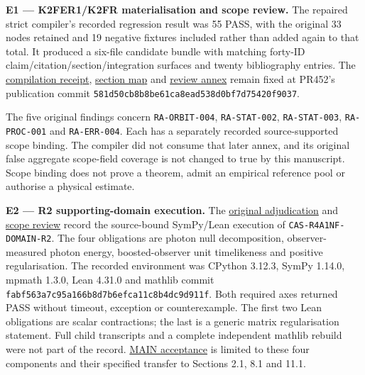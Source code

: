 \documentclass[
  11pt,
  a4paper]{article}
\begin{document}
\textbf{E1 --- K2FER1/K2FR materialisation and scope review.} The repaired strict compiler's recorded regression result was 55 PASS, with the original 33 nodes retained and 19 negative fixtures included rather than added again to that total. It produced a six-file candidate bundle with matching forty-ID claim/citation/section/integration surfaces and twenty bibliography entries. The \href{https://github.com/cosmosapjw-quantum/htt_base/blob/581d50cb8b8be61ca8ead538d0bf7d75420f9037/artifacts/research_reports/k2fr_20260905/authority-bundle/K2F_COMPILATION_RECEIPT.json}{compilation receipt}, \href{https://github.com/cosmosapjw-quantum/htt_base/blob/581d50cb8b8be61ca8ead538d0bf7d75420f9037/artifacts/research_reports/k2fr_20260905/authority-bundle/REPORT_SECTION_CLAIM_MAP_V3.csv}{section map} and \href{https://github.com/cosmosapjw-quantum/htt_base/blob/581d50cb8b8be61ca8ead538d0bf7d75420f9037/artifacts/research_reports/k2fr_20260905/K2FR_REVIEW_ANNEX.json}{review annex} remain fixed at PR452's publication commit {\ttfamily\nolinkurl{581d50cb8b8be61ca8ead538d0bf7d75420f9037}}.

The five original findings concern \texttt{RA-ORBIT-004}, \texttt{RA-STAT-002}, \texttt{RA-STAT-003}, \texttt{RA-PROC-001} and \texttt{RA-ERR-004}. Each has a separately recorded source-supported scope binding. The compiler did not consume that later annex, and its original false aggregate scope-field coverage is not changed to true by this manuscript. Scope binding does not prove a theorem, admit an empirical reference pool or authorise a physical estimate.

\textbf{E2 --- R2 supporting-domain execution.} The \href{https://github.com/cosmosapjw-quantum/htt_base/blob/9a37311cc97a9f670ab6c7f300b0cf74ccabe121/artifacts/research_reports/r4a1er_20260905_local_084030z/local_return/CAS_ADJUDICATION_R4A1NF_DOMAIN.json}{original adjudication} and \href{https://github.com/cosmosapjw-quantum/htt_base/blob/9a37311cc97a9f670ab6c7f300b0cf74ccabe121/artifacts/research_reports/r4a1er_20260905_local_084030z/R4A1ER_SCOPE_REVIEW.md}{scope review} record the source-bound SymPy/Lean execution of \texttt{CAS-R4A1NF-DOMAIN-R2}. The four obligations are photon null decomposition, observer-measured photon energy, boosted-observer unit timelikeness and positive regularisation. The recorded environment was CPython 3.12.3, SymPy 1.14.0, mpmath 1.3.0, Lean 4.31.0 and mathlib commit {\ttfamily\nolinkurl{fabf563a7c95a166b8d7b6efca11c8b4dc9d911f}}. Both required axes returned PASS without timeout, exception or counterexample. The first two Lean obligations are scalar contractions; the last is a generic matrix regularisation statement. Full child transcripts and a complete independent mathlib rebuild were not part of the record. \href{https://github.com/cosmosapjw-quantum/htt_base/pull/453\#issuecomment-5551797917}{MAIN acceptance} is limited to these four components and their specified transfer to Sections 2.1, 8.1 and 11.1.
\end{document}
